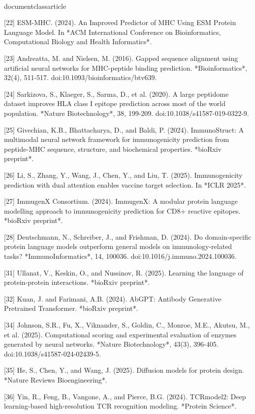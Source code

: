 \\documentclass{article}
\begin{document}
[22] ESM-MHC. (2024). An Improved Predictor of MHC Using ESM Protein Language Model. In *ACM International Conference on Bioinformatics, Computational Biology and Health Informatics*.

[23] Andreatta, M. and Nielsen, M. (2016). Gapped sequence alignment using artificial neural networks for MHC-peptide binding prediction. *Bioinformatics*, 32(4), 511-517. doi:10.1093/bioinformatics/btv639.

[24] Sarkizova, S., Klaeger, S., Sarma, D., et al. (2020). A large peptidome dataset improves HLA class I epitope prediction across most of the world population. *Nature Biotechnology*, 38, 199-209. doi:10.1038/s41587-019-0322-9.

[25] Givechian, K.B., Bhattacharya, D., and Baldi, P. (2024). ImmunoStruct: A multimodal neural network framework for immunogenicity prediction from peptide-MHC sequence, structure, and biochemical properties. *bioRxiv preprint*.

[26] Li, S., Zhang, Y., Wang, J., Chen, Y., and Liu, T. (2025). Immunogenicity prediction with dual attention enables vaccine target selection. In *ICLR 2025*.

[27] ImmugenX Consortium. (2024). ImmugenX: A modular protein language modelling approach to immunogenicity prediction for CD8+ reactive epitopes. *bioRxiv preprint*.

[28] Deutschmann, N., Schreiber, J., and Frishman, D. (2024). Do domain-specific protein language models outperform general models on immunology-related tasks? *ImmunoInformatics*, 14, 100036. doi:10.1016/j.immuno.2024.100036.

[31] Ullanat, V., Keskin, O., and Nussinov, R. (2025). Learning the language of protein-protein interactions. *bioRxiv preprint*.

[32] Kuan, J. and Farimani, A.B. (2024). AbGPT: Antibody Generative Pretrained Transformer. *bioRxiv preprint*.

[34] Johnson, S.R., Fu, X., Viknander, S., Goldin, C., Monroe, M.E., Akutsu, M., et al. (2025). Computational scoring and experimental evaluation of enzymes generated by neural networks. *Nature Biotechnology*, 43(3), 396-405. doi:10.1038/s41587-024-02439-5.

[35] He, S., Chen, Y., and Wang, J. (2025). Diffusion models for protein design. *Nature Reviews Bioengineering*.

[36] Yin, R., Feng, B., Vangone, A., and Pierce, B.G. (2024). TCRmodel2: Deep learning-based high-resolution TCR recognition modeling. *Protein Science*.
\end{document}

